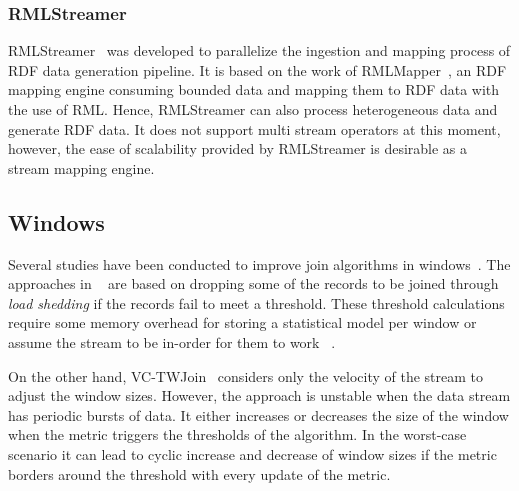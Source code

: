 \subsubsection{RMLStreamer}
RMLStreamer~\cite{rml_streamer}
was developed to parallelize the ingestion and mapping process of RDF data generation pipeline. 
It is based on the work of RMLMapper~\cite{rml}, an RDF mapping engine consuming bounded data and mapping them to RDF data with the use of RML. Hence, RMLStreamer can also 
process heterogeneous data and generate RDF data. It does not support 
multi stream operators at this moment, however, the ease of scalability provided by RMLStreamer
is desirable as a stream mapping engine. 


\subsection{Windows}
Several studies have been conducted to 
improve join algorithms in windows~\cite{vctw_join, join_tracking, grubjoin, approximate_window_sem, approx_window}. 
The approaches in ~\cite{grubjoin, approximate_window_sem, approx_window} are based 
on dropping some of the records to be joined through \emph{load shedding} if the 
records fail to meet a threshold. These threshold calculations require some 
memory overhead for storing a statistical model per window or 
assume the stream to be in-order for them to work
~\cite{grubjoin, approximate_window_sem, approx_window}.

On the other hand, VC-TWJoin~\cite{vctw_join} considers only the velocity of the 
stream to adjust the window sizes. 
However, the approach is unstable when the data stream has periodic bursts of data.
It either increases or decreases the size of the window when the metric triggers 
the thresholds of the algorithm. In the worst-case scenario it 
can lead to cyclic increase and 
decrease of window sizes if the metric borders around the threshold with every 
update of the metric.





